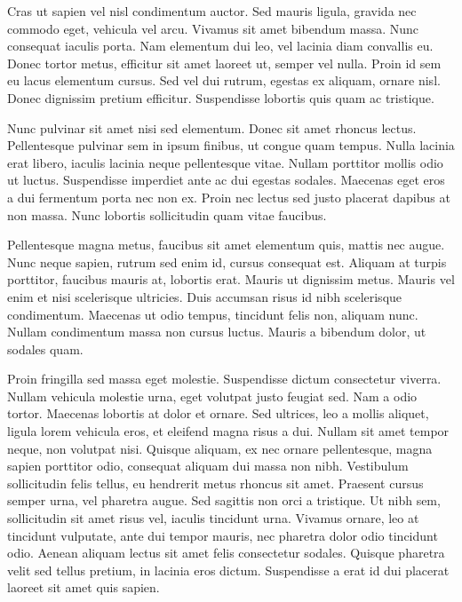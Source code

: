 \documentclass{homework}
\begin{document}
Cras ut sapien vel nisl condimentum auctor. Sed mauris ligula, gravida nec commodo eget, vehicula vel arcu. Vivamus sit amet bibendum massa. Nunc consequat iaculis porta. Nam elementum dui leo, vel lacinia diam convallis eu. Donec tortor metus, efficitur sit amet laoreet ut, semper vel nulla. Proin id sem eu lacus elementum cursus. Sed vel dui rutrum, egestas ex aliquam, ornare nisl. Donec dignissim pretium efficitur. Suspendisse lobortis quis quam ac tristique.

Nunc pulvinar sit amet nisi sed elementum. Donec sit amet rhoncus lectus. Pellentesque pulvinar sem in ipsum finibus, ut congue quam tempus. Nulla lacinia erat libero, iaculis lacinia neque pellentesque vitae. Nullam porttitor mollis odio ut luctus. Suspendisse imperdiet ante ac dui egestas sodales. Maecenas eget eros a dui fermentum porta nec non ex. Proin nec lectus sed justo placerat dapibus at non massa. Nunc lobortis sollicitudin quam vitae faucibus.

Pellentesque magna metus, faucibus sit amet elementum quis, mattis nec augue. Nunc neque sapien, rutrum sed enim id, cursus consequat est. Aliquam at turpis porttitor, faucibus mauris at, lobortis erat. Mauris ut dignissim metus. Mauris vel enim et nisi scelerisque ultricies. Duis accumsan risus id nibh scelerisque condimentum. Maecenas ut odio tempus, tincidunt felis non, aliquam nunc. Nullam condimentum massa non cursus luctus. Mauris a bibendum dolor, ut sodales quam.

Proin fringilla sed massa eget molestie. Suspendisse dictum consectetur viverra. Nullam vehicula molestie urna, eget volutpat justo feugiat sed. Nam a odio tortor. Maecenas lobortis at dolor et ornare. Sed ultrices, leo a mollis aliquet, ligula lorem vehicula eros, et eleifend magna risus a dui. Nullam sit amet tempor neque, non volutpat nisi. Quisque aliquam, ex nec ornare pellentesque, magna sapien porttitor odio, consequat aliquam dui massa non nibh. Vestibulum sollicitudin felis tellus, eu hendrerit metus rhoncus sit amet. Praesent cursus semper urna, vel pharetra augue. Sed sagittis non orci a tristique. Ut nibh sem, sollicitudin sit amet risus vel, iaculis tincidunt urna. Vivamus ornare, leo at tincidunt vulputate, ante dui tempor mauris, nec pharetra dolor odio tincidunt odio. Aenean aliquam lectus sit amet felis consectetur sodales. Quisque pharetra velit sed tellus pretium, in lacinia eros dictum. Suspendisse a erat id dui placerat laoreet sit amet quis sapien.
\end{document}
